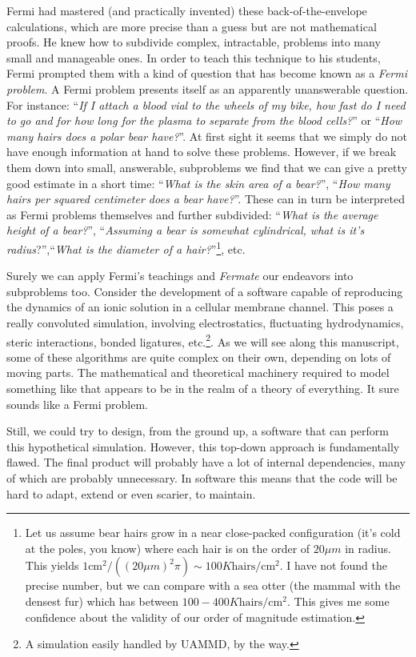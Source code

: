 \documentclass[twoside,openright,titlepage,numbers=noenddot,%
headinclude,footinclude,cleardoublepage=empty,abstract=on,
BCOR=5mm,fontsize=11pt, dvipsnames, paper=b5
]{scrreprt}
\newcommand{\uammd}{\gls{UAMMD}\xspace}
\begin{document}
Fermi had mastered (and practically invented) these back-of-the-envelope calculations, which are more precise than a guess but are not mathematical proofs. He knew how to subdivide complex, intractable, problems into many small and manageable ones. In order to teach this technique to his students, Fermi prompted them with a kind of question that has become known as a \emph{Fermi problem}. A Fermi problem presents itself as an apparently unanswerable question. For instance: ``\emph{If I attach a blood vial to the wheels of my bike, how fast do I need to go and for how long for the plasma to separate from the blood cells?}'' or ``\emph{How many hairs does a polar bear have?}''. At first sight it seems that we simply do not have enough information at hand to solve these problems. However, if we break them down into small, answerable, subproblems we find that we can give a pretty good estimate in a short time: ``\emph{What is the skin area of a bear?}'', ``\emph{How many hairs per squared centimeter does a bear have?}''. These can in turn be interpreted as Fermi problems themselves and further subdivided: ``\emph{What is the average height of a bear?}'', ``\emph{Assuming a bear is somewhat cylindrical, what is it's radius}?'',``\emph{What is the diameter of a hair?}''\footnote{Let us assume bear hairs grow in a near close-packed configuration (it's cold at the poles, you know) where each hair is on the order of $20\mu m$ in radius. This yields $1\text{cm}^2/((20\mu m)^2\pi) \sim 100K \text{hairs}/\text{cm}^2$. I have not found the precise number, but we can compare with a sea otter (the mammal with the densest fur) which has between $100-400K \text{hairs}/\text{cm}^2$. This gives me some confidence about the validity of our order of magnitude estimation.}, etc.

Surely we can apply Fermi's teachings and \emph{Fermate} our endeavors into subproblems too.
Consider the development of a software capable of reproducing the dynamics of an ionic solution in a cellular membrane channel. This poses a really convoluted simulation, involving electrostatics, fluctuating hydrodynamics, steric interactions, bonded ligatures, etc.\footnote{A simulation easily handled by \uammd, by the way.}. As we will see along this manuscript, some of these algorithms are quite complex on their own, depending on lots of moving parts. The mathematical and theoretical machinery required to model something like that appears to be in the realm of a theory of everything. It sure sounds like a Fermi problem.

Still, we could try to design, from the ground up, a software that can perform this hypothetical simulation. 
However, this top-down approach is fundamentally flawed. The final product will probably have a lot of internal dependencies, many of which are probably unnecessary. In software this means that the code will be hard to adapt, extend or even scarier, to maintain.
\end{document}
